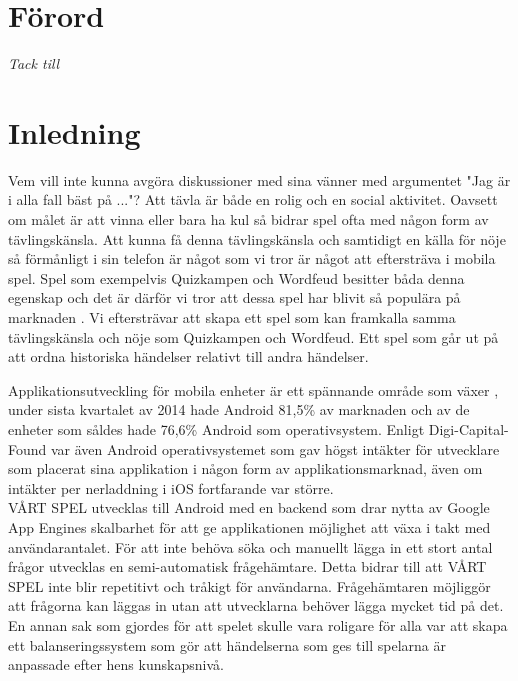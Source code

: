 \documentclass[a4paper, 11pt]{article}
\begin{document}
\newpage
\section{Förord}
\textit{Tack till}
\newpage
\tableofcontents
\pagebreak

\section{Inledning}
Vem vill inte kunna avgöra diskussioner med sina vänner med argumentet "Jag är i alla fall bäst på ..."? 
Att tävla är både en rolig och en social aktivitet. Oavsett om målet är att vinna eller bara ha kul så bidrar spel ofta med någon form av tävlingskänsla. Att kunna få denna tävlingskänsla och samtidigt en källa för nöje så förmånligt i sin telefon är något som vi tror är något att eftersträva i mobila spel. Spel som exempelvis Quizkampen \cite{quiz} och Wordfeud \cite{wordfeud} besitter båda denna egenskap och det är därför vi tror att dessa spel har blivit så populära på marknaden \cite{appsalesrating}. Vi eftersträvar att skapa ett spel som kan framkalla samma tävlingskänsla och nöje som Quizkampen och Wordfeud. Ett spel som går ut på att ordna historiska händelser relativt till andra händelser. 

Applikationsutveckling för mobila enheter är ett spännande område som växer \cite{IDC}, under sista kvartalet av 2014 hade Android 81,5\% av marknaden och av de enheter som såldes hade 76,6\% Android som operativsystem. Enligt Digi-Capital-Found \cite{revenue} var även Android operativsystemet som gav högst intäkter för utvecklare som placerat sina applikation i någon form av applikationsmarknad, även om intäkter per nerladdning i iOS fortfarande var större. \\

VÅRT SPEL utvecklas till Android med en backend som drar nytta av Google App Engines skalbarhet för att ge applikationen möjlighet att växa i takt med användarantalet. För att inte behöva söka och manuellt lägga in ett stort antal frågor utvecklas en semi-automatisk frågehämtare. Detta bidrar till att VÅRT SPEL inte blir repetitivt och tråkigt för användarna. Frågehämtaren möjliggör att frågorna kan läggas in utan att utvecklarna behöver lägga mycket tid på det. En annan sak som gjordes för att spelet skulle vara roligare för alla var att skapa ett balanseringssystem som gör att händelserna som ges till spelarna är anpassade efter hens kunskapsnivå.
\end{document}
